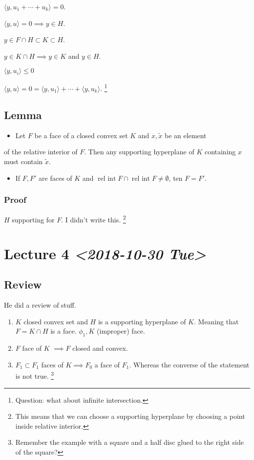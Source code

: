 \documentclass[11pt]{article}
\def\relint{\operatorname{rel\ int}}
\begin{document}
\(\langle y, u_1 + \cdots + u_k \rangle = 0\).

\(\langle y, u \rangle = 0 \implies y \in H\). 

\(y \in F \cap H \subset K \subset H\). 

\(y \in K \cap H \implies y \in K\) and \(y\in H\). 

\(\langle y, u_i \rangle \le 0\) 

\(\langle y, u \rangle = 0 = \langle y, u_1 \rangle + \cdots + \langle y,
    u_k\rangle\). \footnote{Question: what about infinite intersection.}
\subsection{Lemma}
\label{sec:org0ec6c18}
\begin{itemize}
\item Let \(F\) be a face of a closed convex set \(K\) and \(x, \tilde x\) be an element
\end{itemize}
of the relative interior of \(F\). Then any supporting hyperplane of \(K\)
containing \(x\) must contain \(\tilde x\).
\begin{itemize}
\item If \(F, F'\) are faces of \(K\) and \(\relint F \cap \relint F \neq \emptyset\),
ten \(F = F'\).
\end{itemize}
\subsubsection{Proof}
\label{sec:org5499b57}
\(H\) supporting for \(F\). I didn't write this. \footnote{This means that we can choose a supporting hyperplane by choosing a
point inside relative interior.}
\section{Lecture 4 \textit{<2018-10-30 Tue>}}
\label{sec:org47290e7}
\subsection{Review}
\label{sec:org3e2d7d0}
He did a review of stuff. 

\begin{enumerate}
\item \(K\) closed convex set and \(H\) is a supporting hyperplane of \(K\). Meaning
that \(F = K \cap H\) is a face. \(\phi_1, K\) (improper) face.
\item \(F\) face of \(K\) \(\implies F\) closed and convex.
\item \(F_1 \subset F_1\) faces of \(K \implies F_0\) a face of \(F_1\). Whereas the
converse of the statement is not true. \footnote{Remember the example with a square and a half disc glued to the right side of the square?}
\end{enumerate}
\end{document}
